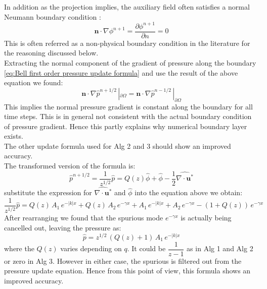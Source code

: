 In addition as the projection implies, the auxiliary field often satisfies a normal Neumann boundary condition :
\begin{equation*}
\textbf{n} \cdot \nabla \phi^{n+1} = \dfrac{\partial \phi^{n+1}}{\partial n} = 0
\end{equation*}
This is often referred as a non-physical boundary condition in the literature \cite{strikwerda1999accuracy, guermond2004error, brown2001accurate} for the reasoning discussed below.\\
Extracting the normal component of the gradient of pressure along the boundary \eqref{eq:Bell first order pressure update formula} and use the result of the above equation we found:
\begin{equation}
\textbf{n} \cdot \nabla \hat{p}^{n+1/2}\,|_{\partial \Omega} = \textbf{n} \cdot \nabla \hat{p}^{n-1/2}\,|_{\partial \Omega}
\end{equation}
This implies the normal pressure gradient is constant along the boundary for all time steps. This is in general not consistent with the actual boundary condition of pressure gradient. Hence this partly explains why numerical boundary layer exists.\\

The other update formula used for Alg 2 and 3 should show an improved accuracy.\\
The transformed version of the formula is:
\begin{equation}
\hat{p}^{n+1/2} = \dfrac{1}{z^{1/2}}\hat{p} = Q(z)\hat{\phi} + \hat{\phi} - \dfrac{1}{2}\hat{\nabla \cdot \textbf{u}^*}
\end{equation}
substitute the expression for $\hat{\nabla \cdot \textbf{u}^*}$ and $\hat{\phi}$ into the equation above we obtain:
\begin{equation}
\dfrac{1}{z^{1/2}}\hat{p} = Q(z)\,A_1\,e^{-|k|x} + Q(z)\,A_2 \,e^{-\gamma x} + A_1\,e^{-|k|x} + A_2 \,e^{-\gamma x} - (1+Q(z)) \,e^{-\gamma x}
\end{equation}
After rearranging we found that the spurious mode $e^{-\gamma x}$ is actually being cancelled out, leaving the pressure as:
\begin{equation}
\hat{p} = z^{1/2}\,(Q(z) + 1)\,A_1\,e^{-|k|x} 
\end{equation}
where the $Q(z)$ varies depending on $q$. It could be $\dfrac{1}{z-1}$ as in Alg 1 and Alg 2 or zero in Alg 3. However in either case, the spurious is filtered out from the pressure update equation. Hence from this point of view, this formula shows an improved accuracy.\\

